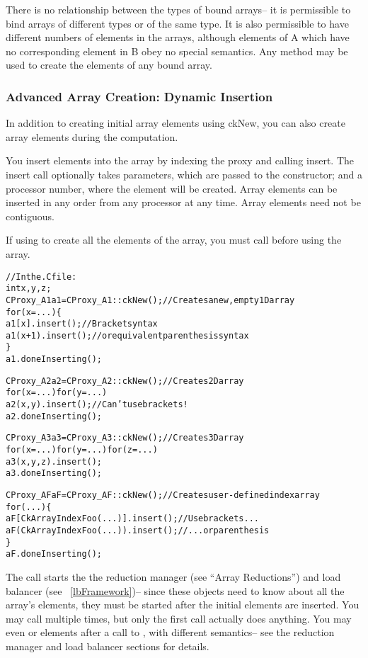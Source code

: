 There is no relationship between the types of bound arrays--
it is permissible to bind arrays of different types or of the
same type.  It is also permissible to have different numbers
of elements in the arrays, although elements of A which have
no corresponding element in B obey no special semantics.
Any method may be used to create the elements of any bound
array.


\subsubsection{Advanced Array Creation: Dynamic Insertion}

In addition to creating initial array elements using ckNew,
you can also
create array elements during the computation.

You insert elements into the array by indexing the proxy
and calling insert.  The insert call optionally takes 
parameters, which are passed to the constructor; and a
processor number, where the element will be created.
Array elements can be inserted in any order from 
any processor at any time.  Array elements need not 
be contiguous.

If using  to create all the elements of the array,
you must call  before using
the array.

\begin{alltt}
//In the .C file:
int x,y,z;
CProxy_A1 a1=CProxy_A1::ckNew();  //Creates a new, empty 1D array
for (x=...) \{
   a1[x  ].insert();  //Bracket syntax
   a1(x+1).insert();  // or equivalent parenthesis syntax
\}
a1.doneInserting();

CProxy_A2 a2=CProxy_A2::ckNew();   //Creates 2D array
for (x=...) for (y=...)
   a2(x,y).insert();  //Can't use brackets!
a2.doneInserting();

CProxy_A3 a3=CProxy_A3::ckNew();   //Creates 3D array
for (x=...) for (y=...) for (z=...)
   a3(x,y,z).insert();
a3.doneInserting();

CProxy_AF aF=CProxy_AF::ckNew();   //Creates user-defined index array
for (...) \{
   aF[CkArrayIndexFoo(...)].insert(); //Use brackets...
   aF(CkArrayIndexFoo(...)).insert(); //  ...or parenthesis
\}
aF.doneInserting();

\end{alltt}

The  call starts the the reduction manager (see ``Array
Reductions'') and load balancer (see ~\ref{lbFramework})-- since
these objects need to know about all the array's elements, they
must be started after the initial elements are inserted.
You may call  multiple times, but only the first
call actually does anything.  You may even  or 
elements after a call to , with different semantics-- 
see the reduction manager and load balancer sections for details.

